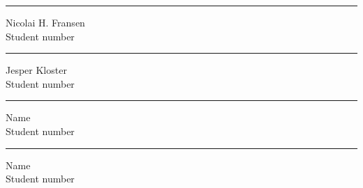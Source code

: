 \begin{titlingpage}
\begin{center}
\begin{minipage}{0.25\linewidth}
\end{minipage}
\hspace{10pt}
\vspace{20pt}
\begin{minipage}{0.25\linewidth}
	\centering
	\hrule
	\vspace{12pt}
	Nicolai H. Fransen\\
	Student number %
\end{minipage}
\hspace{10pt}
\begin{minipage}{0.25\linewidth}
	\centering
	\hrule
	\vspace{12pt}
	Jesper Kloster\\
	Student number %
\end{minipage}
\hspace{10pt}
\begin{minipage}{0.25\linewidth}
	\centering
	\hrule
	\vspace{12pt}
	Name\\ %
	Student number %
\end{minipage}
\hspace{10pt}
\vspace{20pt}
\begin{minipage}{0.25\linewidth}
	\centering
	\hrule
	\vspace{12pt}
	Name\\ %
	Student number %
\end{minipage}


\end{center}

\end{titlingpage}

\clearpage
\tableofcontents












\printbibliography

